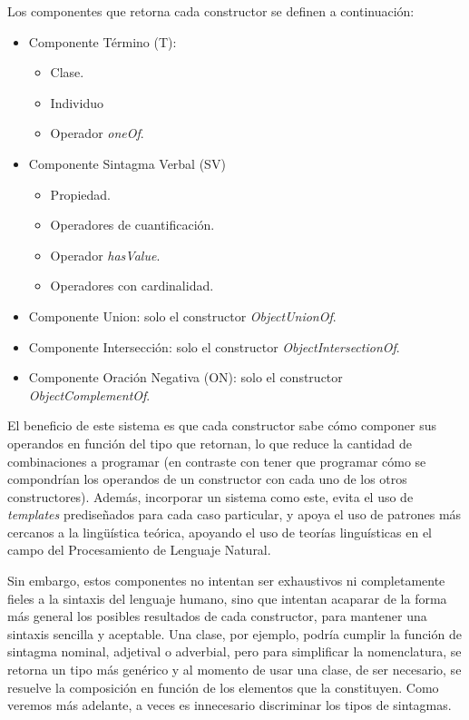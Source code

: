 Los componentes que retorna cada constructor se definen a continuación:
\begin{itemize}
    \item Componente Término (T):
    \begin{itemize}
        \item Clase.
        \item Individuo
        \item Operador \emph{oneOf}.
    \end{itemize}
    \item Componente Sintagma Verbal (SV)
    \begin{itemize}
        \item Propiedad.
        \item Operadores de cuantificación.
        \item Operador \emph{hasValue}.
        \item Operadores con cardinalidad.
    \end{itemize}
    \item Componente Union: solo el constructor \emph{ObjectUnionOf}.
    \item Componente Intersección: solo el constructor \emph{ObjectIntersectionOf}.
    \item Componente Oración Negativa (ON): solo el constructor \emph{ObjectComplementOf}.
\end{itemize}

El beneficio de este sistema es que cada constructor sabe cómo componer sus operandos en función del tipo que retornan, lo que reduce la cantidad de combinaciones a programar (en contraste con tener que programar cómo se compondrían los operandos de un constructor con cada uno de los otros constructores). Además, incorporar un sistema como este, evita el uso de \emph{templates} prediseñados para cada caso particular, y apoya el uso de patrones más cercanos a la lingüística teórica, apoyando el uso de teorías linguísticas en el campo del Procesamiento de Lenguaje Natural.


Sin embargo, estos componentes no intentan ser exhaustivos ni completamente fieles a la sintaxis del lenguaje humano, sino que intentan acaparar de la forma más general los posibles resultados de cada constructor, para mantener una sintaxis sencilla y aceptable. Una clase, por ejemplo, podría cumplir la función de sintagma nominal, adjetival o adverbial, pero para simplificar la nomenclatura, se retorna un tipo más genérico y al momento de usar una clase, de ser necesario, se resuelve la composición en función de los elementos que la constituyen. Como veremos más adelante, a veces es innecesario discriminar los tipos de sintagmas.


